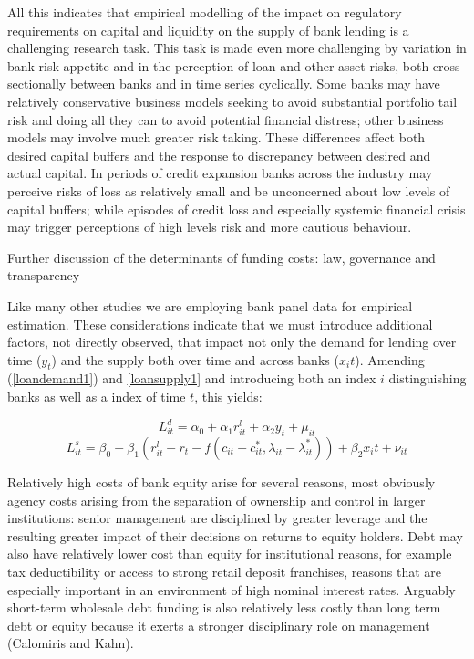 \documentclass[
]{article}
\begin{document}
All this indicates that empirical modelling of the impact on regulatory requirements on capital and liquidity on the supply of bank lending is a challenging research task. This task is made even more challenging by variation in bank risk appetite and in the perception of loan and other asset risks, both cross-sectionally between banks and in time series cyclically. Some banks may have relatively conservative business models seeking to avoid substantial portfolio tail risk and doing all they can to avoid potential financial distress; other business models may involve much greater risk taking. These differences affect both desired capital buffers and the response to discrepancy between desired and actual capital. In periods of credit expansion banks across the industry may perceive risks of loss as relatively small and be unconcerned about low levels of capital buffers; while episodes of credit loss and especially systemic financial crisis may trigger perceptions of high levels risk and more cautious behaviour.

Further discussion of the determinants of funding costs: law, governance and transparency

Like many other studies we are employing bank panel data for empirical estimation. These considerations indicate that we must introduce additional factors, not directly observed, that impact not only the demand for lending over time (\(y_t\)) and the supply both over time and across banks (\(x_it\)). Amending (\ref{loandemand1}) and \ref{loansupply1} and introducing both an index \(i\) distinguishing banks as well as a index of time \(t\), this yields:

\[
L^d_{it}=\alpha_0+\alpha_1 r^l_{it}+\alpha_2 y_t+ \mu_{it} \label{loandemand2}
\]
\[
L^s_{it}=\beta_0+\beta_1 (r^l_{it}-r_{t}-f(c_{it}-c^\ast_{it},\lambda_{it}-\lambda^\ast_{it}))+\beta_2 x_it+\nu_{it} \label{loansupply2}
\]

Relatively high costs of bank equity arise for several reasons, most obviously agency costs arising from the separation of ownership and control in larger institutions: senior management are disciplined by greater leverage and the resulting greater impact of their decisions on returns to equity holders. Debt may also have relatively lower cost than equity for institutional reasons, for example tax deductibility or access to strong retail deposit franchises, reasons that are especially important in an environment of high nominal interest rates. Arguably short-term wholesale debt funding is also relatively less costly than long term debt or equity because it exerts a stronger disciplinary role on management (Calomiris and Kahn).
\end{document}
